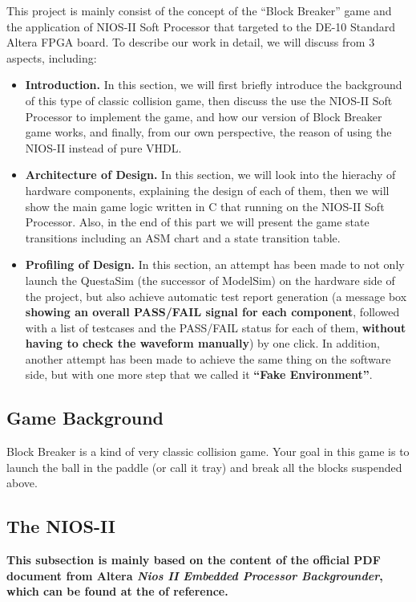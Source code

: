 \documentclass[conference]{IEEEtran}
\begin{document}
This project is mainly consist of the concept of the ``Block Breaker'' game and the application of NIOS-II Soft Processor that targeted to the DE-10 Standard Altera FPGA board. To describe our work in detail, we will discuss from 3 aspects, including:

\begin{itemize}
    \item \textbf{Introduction.} In this section, we will first briefly introduce the background of this type of classic collision game, then discuss the use the NIOS-II Soft Processor to implement the game, and how our version of Block Breaker game works, and finally, from our own perspective, the reason of using the NIOS-II instead of pure VHDL. 
    \item \textbf{Architecture of Design.} In this section, we will look into the hierachy of hardware components, explaining the design of each of them, then we will show the main game logic written in C that running on the NIOS-II Soft Processor. Also, in the end of this part we will present the game state transitions including an ASM chart and a state transition table.
    \item \textbf{Profiling of Design.} In this section, an attempt has been made to not only launch the QuestaSim (the successor of ModelSim) on the hardware side of the project, but also achieve automatic test report generation (a message box \textbf{showing an overall PASS/FAIL signal for each component}, followed with a list of testcases and the PASS/FAIL status for each of them, \textbf{without having to check the waveform manually}) by one click. In addition, another attempt has been made to achieve the same thing on the software side, but with one more step that we called it \textbf{``Fake Environment''}.
\end{itemize}


\subsection{Game Background}
Block Breaker is a kind of very classic collision game. Your goal in this game is to launch the ball in the paddle (or call it tray) and break all the blocks suspended above.

\subsection{The NIOS-II}
\textbf{This subsection is mainly based on the content of the official PDF document from Altera \emph{Nios II Embedded Processor Backgrounder}, which can be found at the \cite{bib_nios2} of reference.}
\end{document}
